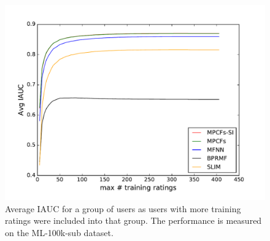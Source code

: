 \begin{figure}[p]
	\centering
	\includegraphics[width=0.7\linewidth]{./section-chapter2/figures/ml-100k_comparison_iauc.pdf}
	\caption{Average IAUC for a group of users as users with more training ratings were included into that group.
		The performance is measured on the ML-100k-sub dataset.}
	\label{f:ml-100k-comp-iauc}
\end{figure}

